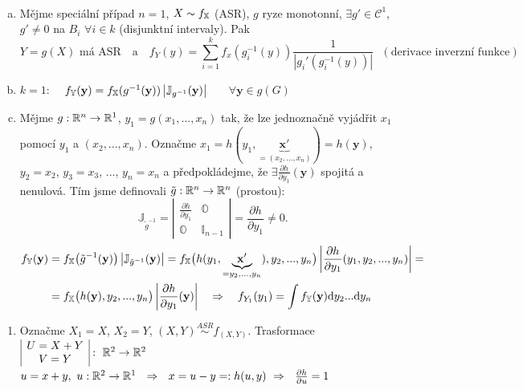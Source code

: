 \begin{dusl}~
	\begin{enumerate}[a)]
		\item Mějme speciální případ $n=1$, $X\sim f_{\mathbb{X}} $ (ASR), $g$ ryze monotonní, $\exists g'\in\mathcal{C}^1$, $g'\neq 0$ na $B_i$ $\forall i\in\hat{k}$ (disjunktní intervaly). Pak $$Y=g(X)\text{ má ASR ~~a~~ }f_Y(y)=\sum\limits_{i=1}^k f_x (g_i^{-1}(y))\frac{1}{\left| g_i'(g_i^{-1}(y)) \right|}~~~(\text{derivace inverzní funkce})$$
		\item $k=1$:~~ $f_\mathbb{Y}(\textbf{y})=f_{\mathbb{X}}(g^{-1}(\textbf{y}))\left| \mathbb{J}_{g^{-1}}(\textbf{y}) \right|$ ~~~$\forall \textbf{y}\in g(G)$
		\item Mějme $g:\mathbb{R}^n\to\mathbb{R}^1$, $y_1=g(x_1,... ,x_n)$ tak, že lze jednoznačně vyjádřit $x_1$ pomocí $y_1$ a $(x_2,... ,x_n)$. Označme $x_1=h(y_1,\underbrace{\textbf{x}'}_{=(x_2,... ,x_n)})=h(\textbf{y})$, $y_2=x_2$, $y_3=x_3$, ...,  $y_n=x_n$ 
		a předpokládejme, že $\exists \frac{\partial h}{\partial y_1}(\textbf{y})$ spojitá a nenulová. Tím jsme definovali $\tilde{g}:\mathbb{R}^n\to\mathbb{R}^n$ (prostou): $$\mathbb{J}_{\tilde{g}^{-1}}=\left| \begin{array}{cccc}
		\frac{\partial h}{\partial y_1} & \mathbb{O} \\ 
		\mathbb{O}&  \mathbb{I}_{n-1}
		\end{array}\right|= \frac{\partial h}{\partial y_1}\neq 0.$$
		\[
		\begin{split}
		f_\mathbb{Y}(\textbf{y})&=f_{\mathbb{X}}\bigl(\tilde{g}^{-1}(\textbf{y})\bigr) \left| \mathbb{J}_{\tilde{g}^{-1}}(\textbf{y}) \right|=f_{\mathbb{X}}\bigl(h(y_1,\underbrace{\textbf{x}'}_{=y_2,... ,y_n}),y_2,... ,y_n\bigr)\left| \frac{\partial h}{\partial y_1}(y_1,y_2,... ,y_n) \right|= \\ &= f_{\mathbb{X}}\bigl(h(\textbf{y}),y_2,... ,y_n\bigr) \left| \frac{\partial h}{\partial y_1}(\textbf{y}) \right|~~~\Rightarrow~ ~~f_{Y_1}(y_1)=\int f_\mathbb{Y} (\textbf{y})\mathrm{d} y_2... \mathrm{d} y_n 
		\end{split}
		\] 
	\end{enumerate}
\begin{enumerate}[c2)]
	\item Označme $X_1=X$, $X_2=Y$, $(X,Y)\stackrel{ASR}{\sim}f_{(X,Y)}$. Trasformace $\begin{array}{|c|}
	U=X+Y	\\ V=Y
	\end{array}: ~ \mathbb{R}^2\to\mathbb{R}^2$ \newline 
	$	u=x+y,~u:\mathbb{R}^2\to\mathbb{R}^1~~\Rightarrow~~ x=u-y=:h(u,y)~\Rightarrow~~ \frac{\partial h}{\partial u}=1  $

\end{enumerate}
\end{dusl}
